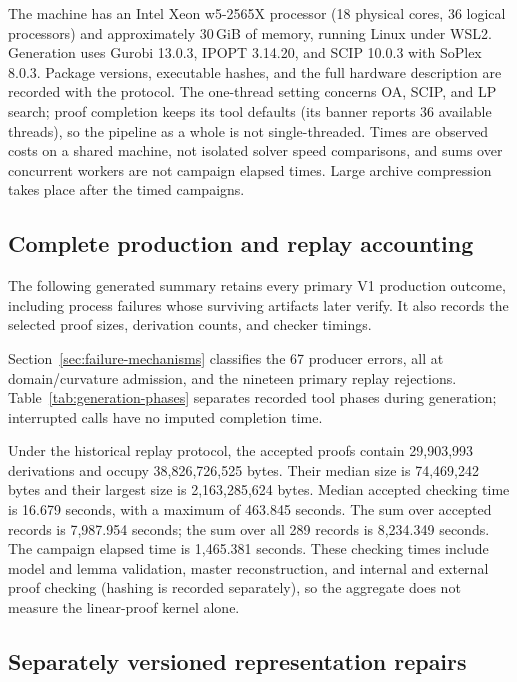 The machine has an Intel Xeon w5-2565X processor (18 physical cores, 36 logical
processors) and approximately 30\,GiB of memory, running Linux under WSL2.
Generation uses Gurobi 13.0.3, IPOPT 3.14.20, and SCIP 10.0.3 with
SoPlex 8.0.3. Package versions, executable hashes, and the full hardware
description are recorded with the protocol. The one-thread setting concerns
OA, SCIP, and LP search; proof completion keeps its tool defaults (its
banner reports 36 available threads), so the pipeline as a whole is not
single-threaded. Times are observed costs on a shared machine,
not isolated solver speed comparisons, and sums over concurrent
workers are not campaign elapsed times. Large archive compression takes place
after the timed campaigns.

\subsection{Complete production and replay accounting}

The following generated summary retains every primary V1 production outcome,
including process failures whose surviving artifacts later verify. It also
records the selected proof sizes, derivation counts, and checker timings.


Section~\ref{sec:failure-mechanisms} classifies the 67 producer errors, all at
domain/curvature admission, and the nineteen primary replay rejections.
Table~\ref{tab:generation-phases} separates recorded tool phases during
generation; interrupted calls have no imputed completion time.


Under the historical replay protocol, the accepted proofs contain 29,903,993 derivations and occupy
38,826,726,525 bytes. Their median size is 74,469,242 bytes and their largest
size is 2,163,285,624 bytes. Median accepted checking time is 16.679 seconds,
with a maximum of 463.845 seconds. The sum over accepted records is
7,987.954 seconds; the sum over all 289 records is 8,234.349 seconds.
The campaign elapsed time is 1,465.381 seconds. These checking times include
model and lemma validation, master reconstruction, and internal and external
proof checking (hashing is recorded separately), so the aggregate does not
measure the linear-proof kernel alone.

\subsection{Separately versioned representation repairs}
\label{app:repair-accounting}

